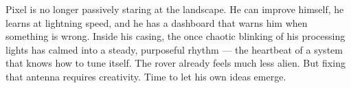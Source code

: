 \begin{tcolorbox}[colback=black!3, colframe=black!40, title=\textbf{Mission Log – End of Cluster II}]
Pixel is no longer passively staring at the landscape.  He can improve
himself, he learns at lightning speed, and he has a dashboard that
warns him when something is wrong.  Inside his casing, the once chaotic
blinking of his processing lights has calmed into a steady, purposeful
rhythm — the heartbeat of a system that knows how to tune itself.
The rover already feels much less alien.  But fixing that antenna
requires creativity.  Time to let his own ideas emerge.
\end{tcolorbox}